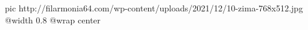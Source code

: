  
 
 
 
 

\ifcmt
  pic http://filarmonia64.com/wp-content/uploads/2021/12/10-zima-768x512.jpg
  @width 0.8
  @wrap center
\fi
